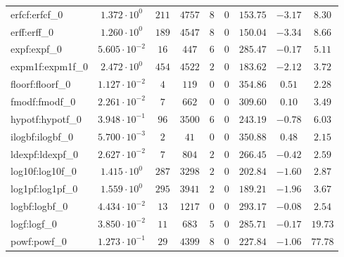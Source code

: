 \begin{tabular}{|l|c|c|c|c|c|c|c|c|}
erfcf:erfcf\_0               & $ 1.372 \cdot 10^{0}  $ & $ 211    $ & $ 4757   $ & $ 8   $ & $ 0   $ & $ 153.75      $ & $ -3.17   $ & $ 8.30    $ \\
erff:erff\_0                 & $ 1.260 \cdot 10^{0}  $ & $ 189    $ & $ 4547   $ & $ 8   $ & $ 0   $ & $ 150.04      $ & $ -3.34   $ & $ 8.66    $ \\
expf:expf\_0                 & $ 5.605 \cdot 10^{-2} $ & $ 16     $ & $ 447    $ & $ 6   $ & $ 0   $ & $ 285.47      $ & $ -0.17   $ & $ 5.11    $ \\
expm1f:expm1f\_0             & $ 2.472 \cdot 10^{0}  $ & $ 454    $ & $ 4522   $ & $ 2   $ & $ 0   $ & $ 183.62      $ & $ -2.12   $ & $ 3.72    $ \\
floorf:floorf\_0             & $ 1.127 \cdot 10^{-2} $ & $ 4      $ & $ 119    $ & $ 0   $ & $ 0   $ & $ 354.86      $ & $ 0.51    $ & $ 2.28    $ \\
fmodf:fmodf\_0               & $ 2.261 \cdot 10^{-2} $ & $ 7      $ & $ 662    $ & $ 0   $ & $ 0   $ & $ 309.60      $ & $ 0.10    $ & $ 3.49    $ \\
hypotf:hypotf\_0             & $ 3.948 \cdot 10^{-1} $ & $ 96     $ & $ 3500   $ & $ 6   $ & $ 0   $ & $ 243.19      $ & $ -0.78   $ & $ 6.03    $ \\
ilogbf:ilogbf\_0             & $ 5.700 \cdot 10^{-3} $ & $ 2      $ & $ 41     $ & $ 0   $ & $ 0   $ & $ 350.88      $ & $ 0.48    $ & $ 2.15    $ \\
ldexpf:ldexpf\_0             & $ 2.627 \cdot 10^{-2} $ & $ 7      $ & $ 804    $ & $ 2   $ & $ 0   $ & $ 266.45      $ & $ -0.42   $ & $ 2.59    $ \\
log10f:log10f\_0             & $ 1.415 \cdot 10^{0}  $ & $ 287    $ & $ 3298   $ & $ 2   $ & $ 0   $ & $ 202.84      $ & $ -1.60   $ & $ 2.87    $ \\
log1pf:log1pf\_0             & $ 1.559 \cdot 10^{0}  $ & $ 295    $ & $ 3941   $ & $ 2   $ & $ 0   $ & $ 189.21      $ & $ -1.96   $ & $ 3.67    $ \\
logbf:logbf\_0               & $ 4.434 \cdot 10^{-2} $ & $ 13     $ & $ 1217   $ & $ 0   $ & $ 0   $ & $ 293.17      $ & $ -0.08   $ & $ 2.54    $ \\
logf:logf\_0                 & $ 3.850 \cdot 10^{-2} $ & $ 11     $ & $ 683    $ & $ 5   $ & $ 0   $ & $ 285.71      $ & $ -0.17   $ & $ 19.73   $ \\
powf:powf\_0                 & $ 1.273 \cdot 10^{-1} $ & $ 29     $ & $ 4399   $ & $ 8   $ & $ 0   $ & $ 227.84      $ & $ -1.06   $ & $ 77.78   $ \\

\end{tabular}
